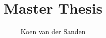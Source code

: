 \documentclass[11pt,a4paper,draft]{report}
\author{Koen van der Sanden}
\title{Master Thesis}
\begin{document}
\maketitle







\cite{PNAS}




\end{document}
